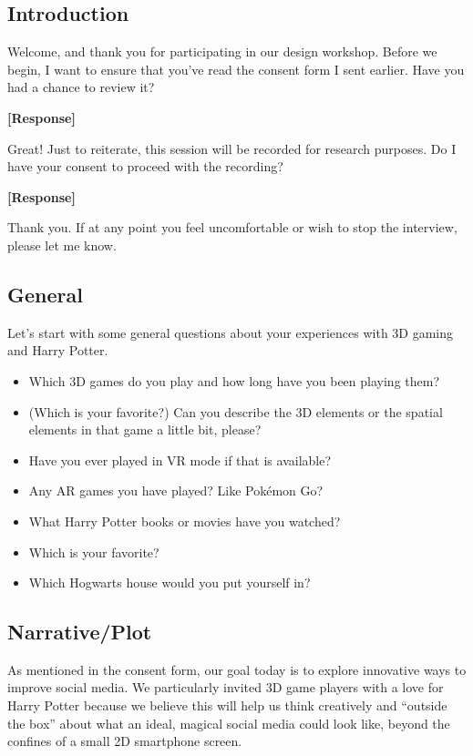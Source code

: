 \subsection*{Introduction}
Welcome, and thank you for participating in our design workshop. Before we begin, I want to ensure that you've read the consent form I sent earlier. Have you had a chance to review it?

\textbf{[Response]}

\noindent Great! Just to reiterate, this session will be recorded for research purposes. Do I have your consent to proceed with the recording?

\textbf{[Response]}

\noindent Thank you. If at any point you feel uncomfortable or wish to stop the interview, please let me know.

\subsection*{General}
Let's start with some general questions about your experiences with 3D gaming and Harry Potter.

\begin{itemize}
    \item Which 3D games do you play and how long have you been playing them?
    \item (Which is your favorite?) Can you describe the 3D elements or the spatial elements in that game a little bit, please?
    \item Have you ever played in VR mode if that is available?
    \item Any AR games you have played? Like Pokémon Go?
    \item What Harry Potter books or movies have you watched?
    \item Which is your favorite?
    \item Which Hogwarts house would you put yourself in?
\end{itemize}

\subsection*{Narrative/Plot}
As mentioned in the consent form, our goal today is to explore innovative ways to improve social media. We particularly invited 3D game players with a love for Harry Potter because we believe this will help us think creatively and ``outside the box'' about what an ideal, magical social media could look like, beyond the confines of a small 2D smartphone screen.

